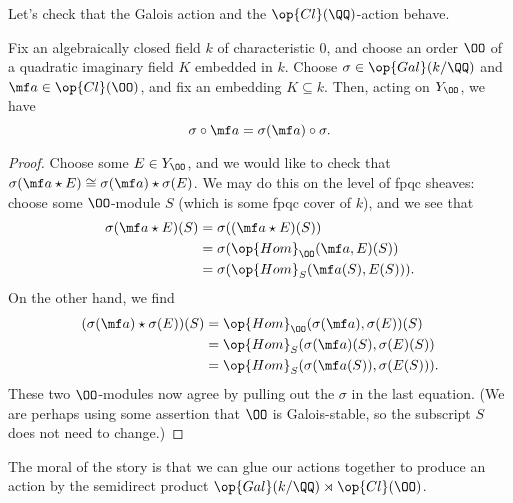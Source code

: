 \documentclass[../notes.tex]{subfiles}
\begin{document}
Let's check that the Galois action and the $\op{Cl}(\QQ)$-action behave.
\begin{lemma} \label{lem:galois-and-cl-action-commute}
	Fix an algebraically closed field $k$ of characteristic $0$, and choose an order $\OO$ of a quad\-ratic imaginary field $K$ embedded in $k$. Choose $\sigma\in\op{Gal}(k/\QQ)$ and $\mf a\in\op{Cl}(\OO)$, and fix an embedding $K\subseteq k$. Then, acting on $Y_\OO$, we have
	\[\sigma\circ\mf a=\sigma(\mf a)\circ\sigma.\]
\end{lemma}
\begin{proof}
	Choose some $E\in Y_\OO$, and we would like to check that $\sigma(\mf a\star E)\cong\sigma(\mf a)\star\sigma(E)$. We may do this on the level of fpqc sheaves: choose some $\OO$-module $S$ (which is some fpqc cover of $k$), and we see that
	\begin{align*}
		\sigma(\mf a\star E)(S) &= \sigma((\mf a\star E)(S)) \\
		&= \sigma(\op{Hom}_\OO(\mf a,E)(S)) \\
		&= \sigma(\op{Hom}_S(\mf a(S),E(S))).
	\end{align*}
	On the other hand, we find
	\begin{align*}
		(\sigma(\mf a)\star\sigma(E))(S) &= \op{Hom}_\OO(\sigma(\mf a),\sigma(E))(S) \\
		&= \op{Hom}_S(\sigma(\mf a)(S),\sigma(E)(S)) \\
		&= \op{Hom}_S(\sigma(\mf a(S)),\sigma(E(S))).
	\end{align*}
	These two $\OO$-modules now agree by pulling out the $\sigma$ in the last equation. (We are perhaps using some assertion that $\OO$ is Galois-stable, so the subscript $S$ does not need to change.)
\end{proof}
The moral of the story is that we can glue our actions together to produce an action by the semidirect product $\op{Gal}(k/\QQ)\rtimes\op{Cl}(\OO)$.
\end{document}
